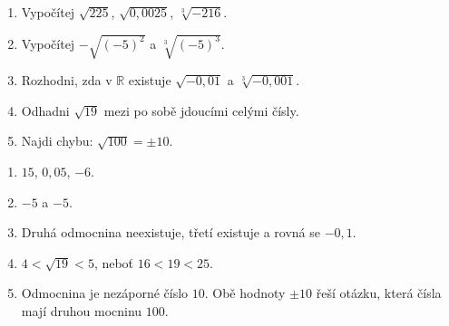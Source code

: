 \documentclass[11pt,a4paper]{article}
\begin{document}

\begin{zadaniReseniBox}[title={Domácí úlohy},breakable=false]
\begin{enumerate}[label=\alph*)]
\item Vypočítej $\sqrt{225}$, $\sqrt{0{,}0025}$, $\sqrt[3]{-216}$.
\item Vypočítej $-\sqrt{(-5)^2}$ a $\sqrt[3]{(-5)^3}$.
\item Rozhodni, zda v $\mathbb R$ existuje $\sqrt{-0{,}01}$ a $\sqrt[3]{-0{,}001}$.
\item Odhadni $\sqrt{19}$ mezi po sobě jdoucími celými čísly.
\item Najdi chybu: $\sqrt{100}=\pm10$.
\end{enumerate}
\tcblower
\begin{enumerate}[label=\alph*)]
\item $15$, $0{,}05$, $-6$.
\item $-5$ a $-5$.
\item Druhá odmocnina neexistuje, třetí existuje a rovná se $-0{,}1$.
\item $4<\sqrt{19}<5$, neboť $16<19<25$.
\item Odmocnina je nezáporné číslo $10$. Obě hodnoty $\pm10$ řeší otázku, která čísla mají druhou mocninu $100$.
\end{enumerate}
\end{zadaniReseniBox}
\end{document}
